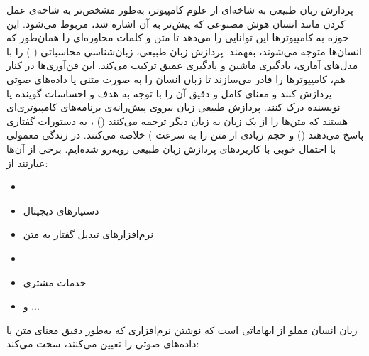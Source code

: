 پردازش زبان طبیعی به شاخه‌ای از علوم کامپیوتر، به‌طور مشخص‌تر به شاخه‌ی عمل کردن مانند انسان هوش مصنوعی که پیش‌تر به آن اشاره شد، مربوط می‌شود. این حوزه به کامپیوترها این توانایی را می‌دهد تا متن و کلمات محاوره‌ای را همان‌طور که انسان‌ها متوجه می‌شوند، بفهمند.
پردازش زبان طبیعی، زبان‌شناسی محاسباتی (
) را با مدل‌های آماری، یادگیری ماشین و یادگیری عمیق ترکیب می‌کند. این فن‌آوری‌ها در کنار هم، کامپیوترها را قادر می‌سازند تا زبان انسان را به صورت متنی یا داده‌های صوتی پردازش کنند و معنای کامل و دقیق آن را با توجه به هدف و احساسات گوینده یا نویسنده درک کنند.
پردازش طبیعی زبان نیروی پیش‌رانه‌ی برنامه‌های کامپیوتری‌ای هستند که متن‌ها را از یک زبان به زبان دیگر ترجمه می‌کنند 
()
، به دستورات گفتاری پاسخ می‌دهند 
()
و حجم زیادی از متن را به سرعت
) خلاصه می‌کنند. در زندگی معمولی با احتمال خوبی با کاربردهای پردازش زبان طبیعی روبه‌رو شده‌ایم. برخی از آن‌ها عبارتند از:
\begin{itemize}
    \item {}
    \item دستیار‌های دیجیتال
    \item نرم‌افزارهای تبدیل گفتار به متن
    \item {}
    \item  خدمات مشتری
    \item و ...
\end{itemize}


زبان انسان مملو از ابهاماتی است که نوشتن نرم‌افزاری که به‌طور دقیق معنای متن یا داده‌های صوتی را تعیین می‌کنند، سخت می‌کند:

